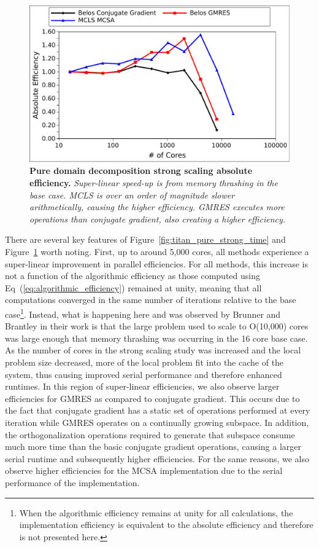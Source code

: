 \begin{figure}[t!]
  \begin{center}
    \includegraphics[width=6in]{chapters/parallel_mc/titan_pure_strong.pdf}
  \end{center}
  \caption{\textbf{Pure domain decomposition strong scaling absolute
      efficiency.}  \textit{Super-linear speed-up is from memory
      thrashing in the base case. MCLS is over an order of magnitude
      slower arithmetically, causing the higher efficiency. GMRES
      executes more operations than conjugate gradient, also creating
      a higher efficiency.}}
  \label{fig:titan_pure_strong}
\end{figure}

There are several key features of
Figure~\ref{fig:titan_pure_strong_time} and
Figure~\ref{fig:titan_pure_strong} worth noting. First, up to around
5,000 cores, all methods experience a super-linear improvement in
parallel efficiencies. For all methods, this increase is not a
function of the algorithmic efficiency as those computed using
Eq~(\ref{eq:algorithmic_efficiency}) remained at unity, meaning that
all computations converged in the same number of iterations relative
to the base case\footnote{When the algorithmic efficiency remains at
  unity for all calculations, the implementation efficiency is
  equivalent to the absolute efficiency and therefore is not presented
  here.}. Instead, what is happening here and was observed by Brunner
and Brantley in their work is that the large problem used to scale to
O(10,000) cores was large enough that memory thrashing was occurring
in the 16 core base case. As the number of cores in the strong scaling
study was increased and the local problem size decreased, more of the
local problem fit into the cache of the system, thus causing improved
serial performance and therefore enhanced runtimes. In this region of
super-linear efficiencies, we also observe larger efficiencies for
GMRES as compared to conjugate gradient. This occurs due to the fact
that conjugate gradient has a static set of operations performed at
every iteration while GMRES operates on a continually growing
subspace. In addition, the orthogonalization operations required to
generate that subspace consume much more time than the basic conjugate
gradient operations, causing a larger serial runtime and subsequently
higher efficiencies. For the same reasons, we also observe higher
efficiencies for the MCSA implementation due to the serial performance
of the implementation.


